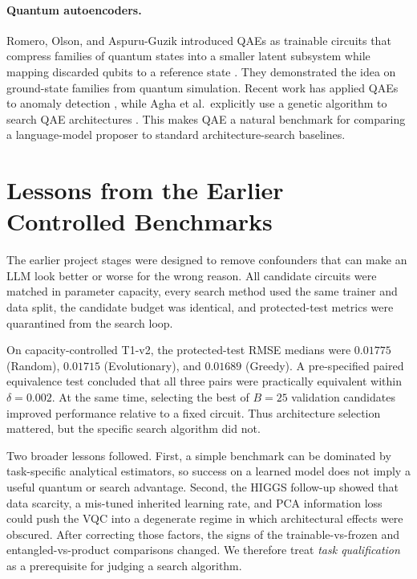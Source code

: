 \documentclass[11pt]{article}
\begin{document}
\paragraph{Quantum autoencoders.}
Romero, Olson, and Aspuru-Guzik introduced QAEs as trainable circuits that compress families of quantum states into a smaller latent subsystem while mapping discarded qubits to a reference state \cite{romero2017}.
They demonstrated the idea on ground-state families from quantum simulation.
Recent work has applied QAEs to anomaly detection \cite{frehner2025,elalami2025}, while Agha et al.\ explicitly use a genetic algorithm to search QAE architectures \cite{agha2025}.
This makes QAE a natural benchmark for comparing a language-model proposer to standard architecture-search baselines.

\section{Lessons from the Earlier Controlled Benchmarks}

The earlier project stages were designed to remove confounders that can make an LLM look better or worse for the wrong reason.
All candidate circuits were matched in parameter capacity, every search method used the same trainer and data split, the candidate budget was identical, and protected-test metrics were quarantined from the search loop.

On capacity-controlled T1-v2, the protected-test RMSE medians were $0.01775$ (Random), $0.01715$ (Evolutionary), and $0.01689$ (Greedy).
A pre-specified paired equivalence test concluded that all three pairs were practically equivalent within $\delta=0.002$.
At the same time, selecting the best of $B=25$ validation candidates improved performance relative to a fixed circuit.
Thus architecture selection mattered, but the specific search algorithm did not.

Two broader lessons followed.
First, a simple benchmark can be dominated by task-specific analytical estimators, so success on a learned model does not imply a useful quantum or search advantage.
Second, the HIGGS follow-up showed that data scarcity, a mis-tuned inherited learning rate, and PCA information loss could push the VQC into a degenerate regime in which architectural effects were obscured.
After correcting those factors, the signs of the trainable-vs-frozen and entangled-vs-product comparisons changed.
We therefore treat \emph{task qualification} as a prerequisite for judging a search algorithm.
\end{document}
